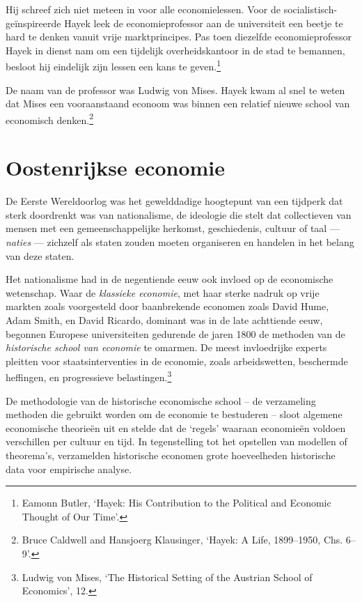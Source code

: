 \documentclass[
  a5paper,
  smalldemyvopaper,11pt,twoside,onecolumn,openright,extrafontsizes]{memoir}
\begin{document}
Hij schreef zich niet meteen in voor alle economielessen. Voor de
socialistisch-geïnspireerde Hayek leek de economieprofessor aan de
universiteit een beetje te hard te denken vanuit vrije marktprincipes.
Pas toen diezelfde economieprofessor Hayek in dienst nam om een
tijdelijk overheidskantoor in de stad te bemannen, besloot hij eindelijk
zijn lessen een kans te geven.\footnote{\hspace{0pt}Eamonn Butler,
  `Hayek: His Contribution to the Political and Economic Thought of Our
  Time'.}

De naam van de professor was Ludwig von Mises. Hayek kwam al snel te
weten dat Mises een vooraanstaand econoom was binnen een relatief nieuwe
school van economisch denken.\footnote{\hspace{0pt}Bruce Caldwell and
  Hansjoerg Klausinger, `Hayek: A Life, 1899--1950, Chs. 6--9'.}

\section{Oostenrijkse economie}\label{oostenrijkse-economie}

De Eerste Wereldoorlog was het gewelddadige hoogtepunt van een tijdperk
dat sterk doordrenkt was van nationalisme, de ideologie die stelt dat
collectieven van mensen met een gemeenschappelijke herkomst,
geschiedenis, cultuur of taal --- \emph{naties} --- zichzelf als staten
zouden moeten organiseren en handelen in het belang van deze staten.

Het nationalisme had in de negentiende eeuw ook invloed op de
economische wetenschap. Waar de \emph{klassieke economie}, met haar
sterke nadruk op vrije markten zoals voorgesteld door baanbrekende
economen zoals David Hume, Adam Smith, en David Ricardo, dominant was in
de late achttiende eeuw, begonnen Europese universiteiten gedurende de
jaren 1800 de methoden van de \emph{historische school van economie} te
omarmen. De meest invloedrijke experts pleitten voor staatsinterventies
in de economie, zoals arbeidswetten, beschermde heffingen, en
progressieve belastingen.\footnote{\hspace{0pt}Ludwig von Mises, `The
  Historical Setting of the Austrian School of Economics', 12.}

De methodologie van de historische economische school -- de verzameling
methoden die gebruikt worden om de economie te bestuderen -- sloot
algemene economische theorieën uit en stelde dat de `regels' waaraan
economieën voldoen verschillen per cultuur en tijd. In tegenstelling tot
het opstellen van modellen of theorema's, verzamelden historische
economen grote hoeveelheden historische data voor empirische analyse.
\end{document}
